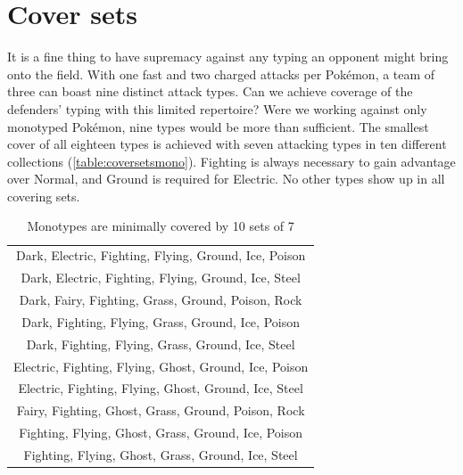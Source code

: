 \section{Cover sets}
\label{sec:coversets}
It is a fine thing to have supremacy against any typing an opponent might bring onto the field.
With one fast and two charged attacks per Pokémon, a team of three can boast nine distinct attack types.
Can we achieve coverage of the defenders' typing with this limited repertoire?
Were we working against only monotyped Pokémon, nine types would be more than sufficient.
The smallest cover of all eighteen types is achieved with seven attacking types in
  ten different collections (\autoref{table:coversetsmono}).
Fighting is always necessary to gain advantage over Normal, and Ground is required for Electric.
No other types show up in all covering sets.
\begin{table}[ht]
\begin{centering}
  \begin{tabular}{c}
 Dark, Electric, Fighting, Flying, Ground, Ice, Poison\\
 Dark, Electric, Fighting, Flying, Ground, Ice, Steel\\
 Dark, Fairy, Fighting, Grass, Ground, Poison, Rock\\
 Dark, Fighting, Flying, Grass, Ground, Ice, Poison\\
 Dark, Fighting, Flying, Grass, Ground, Ice, Steel\\
 Electric, Fighting, Flying, Ghost, Ground, Ice, Poison\\
 Electric, Fighting, Flying, Ghost, Ground, Ice, Steel\\
 Fairy, Fighting, Ghost, Grass, Ground, Poison, Rock\\
 Fighting, Flying, Ghost, Grass, Ground, Ice, Poison\\
 Fighting, Flying, Ghost, Grass, Ground, Ice, Steel\\
  \end{tabular}
  \caption{Monotypes are minimally covered by 10 sets of 7}
  \label{table:coversetsmono}
\end{centering}
\end{table}

